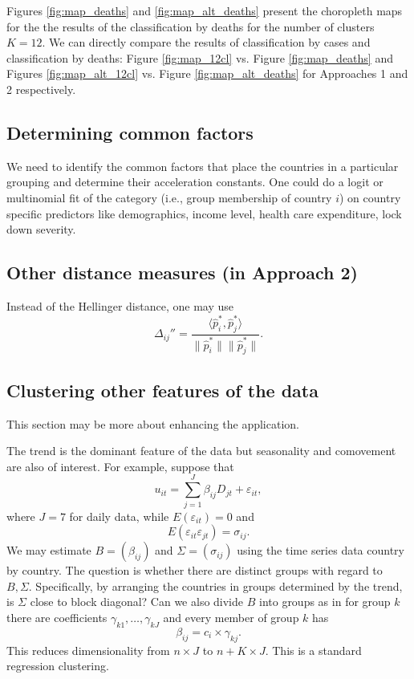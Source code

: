 \documentclass[a4paper,12pt]{article}
\numberwithin{equation}{section}
\begin{document}
{\color{red} Figures \ref{fig:map_deaths} and \ref{fig:map_alt_deaths} present the choropleth maps for the the results of the classification by deaths for the number of clusters $K = 12$. We can directly compare the results of classification by cases and classification by deaths: Figure \ref{fig:map_12cl} vs. Figure \ref{fig:map_deaths} and Figures \ref{fig:map_alt_12cl} vs. Figure \ref{fig:map_alt_deaths} for Approaches 1 and 2 respectively.}

\subsection{Determining common factors}

We need to identify the common factors that place the countries in a particular grouping and determine their acceleration constants. One could do a logit or multinomial fit of the category (i.e., group membership of country $i$) on country specific predictors like demographics, income level, health care expenditure, lock down severity.


\subsection{Other distance measures (in Approach 2)}

Instead of the Hellinger distance, one may use 
\[ \Delta_{ij}'' = \frac{\langle \hat{p}_i^*, \hat{p}_j^* \rangle}{\| \hat{p}_i^* \|  \| \hat{p}_j^* \|}. \] 


\subsection{Clustering other features of the data}

This section may be more about enhancing the application. 

The trend is the dominant feature of the data but seasonality and comovement
are also of interest. For example, suppose that 
\[
u_{it}=\sum_{j=1}^{J}\beta _{ij}D_{jt}+\varepsilon _{it},
\]%
where $J=7$ for daily data, while $E(\varepsilon _{it})=0$ and 
\[
E(\varepsilon _{it}\varepsilon _{jt})=\sigma _{ij}.
\]%
We may estimate $B=(\beta _{ij})$ and $\Sigma =(\sigma _{ij})$ using the
time series data country by country. The question is whether there are
distinct groups with regard to $B,\Sigma .$ Specifically, by arranging the
countries in groups determined by the trend, is $\Sigma $ close to block
diagonal? Can we also divide $B$ into groups as in for group $k$ there are
coefficients $\gamma _{k1},\ldots ,\gamma _{kJ}$ and every member of group $k$ has 
\[
\beta _{ij}=c_{i}\times \gamma _{kj}.
\]%
This reduces dimensionality from $n\times J$ to $n+K\times J.$ This is a
standard regression clustering.
\end{document}
